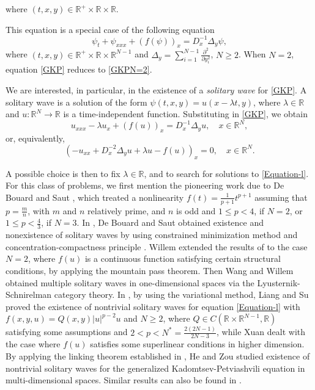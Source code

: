 \documentclass[11pt]{amsart}
\numberwithin{equation}{section}
\begin{document}
where $(t, x, y) \in \mathbb{R}^{+} \times \mathbb{R} \times \mathbb{R}$. {This equation is a special case of the following equation
\begin{equation}\label{GKP}
        \psi_t+\psi_{x x x}+(f(\psi))_x=D_x^{-1} \Delta_y \psi,
\end{equation}
where $(t, x, y) \in \mathbb{R}^{+} \times \mathbb{R} \times \mathbb{R}^{N-1}$ and $\Delta_y=\sum_{i=1}^{N-1} \frac{\partial^2}{\partial y_i^2}$, $N \geq 2$. When $N=2$, equation \eqref{GKP} reduces to \eqref{GKPN=2}.


We are interested, in particular, in the existence of a {\it solitary wave} for \eqref{GKP}.
A solitary wave is a solution of the form {$\psi(t, x, y) = u(x-\lambda t, y)$, where $\lambda \in \mathbb{R}$ and $u: \mathbb{R}^N \rightarrow \mathbb{R}$ is a time-independent function}.
 Substituting in \eqref{GKP}, we obtain
$$
u_{x x x}-\lambda u_x+(f(u))_x=D_x^{-1} \Delta_y u, \quad x\in \mathbb{R}^N,
$$
or, equivalently,
\begin{equation}\label{Equation-l}
\left(-u_{x x}+D_x^{-2} \Delta_y u+\lambda u-f(u)\right)_x=0, \quad x\in \mathbb{R}^N.
\end{equation}

A possible choice is then to fix $\lambda \in \mathbb{R}$, and to search for solutions to \eqref{Equation-l}.
For this class of problems, we first mention the pioneering work
due to  De Bouard and Saut \cite{DS0, DS}, which treated a nonlinearity {$f(t)=\frac{1}{p+1} t^{p+1}$} assuming that $p=\frac{m}{n}$, with $m$ and $n$ relatively prime, and $n$ is odd and $1 \leq p<4$, if $N=2$, or $1 \leq p<\frac{4}{3}$, if $N=3$. In \cite{DS0, DS}, De Bouard and Saut obtained existence and nonexistence of solitary waves by using constrained minimization method and concentration-compactness principle \cite{LionsCCPLocal2}. Willem \cite{Willem} extended the results of \cite{DS0} to the case \( N = 2 \), where \( f(u) \) is a continuous function satisfying certain structural conditions, by applying the mountain pass theorem.
Then Wang and Willem \cite{WW} obtained multiple solitary waves in one-dimensional spaces via the Lyusternik-Schnirelman category theory.  In \cite{LS}, by using the variational method, Liang and Su proved the existence of nontrivial solitary waves for equation \eqref{Equation-l} with
$f(x, y, u)=Q(x, y)\vert u\vert^{p-2}u$ and $N\geq 2$, where $Q\in C(\mathbb{R}\times\mathbb{R}^{N-1}, \mathbb{R})$ satisfying some assumptions and $2<p<N^{*}=\frac{2(2N-1)}{2N-3}$, while Xuan \cite{Xu} dealt with the case where $f(u)$ satisfies some superlinear conditions in higher dimension. By applying the linking theorem established in \cite{SZ}, He and Zou \cite{HZ} studied existence of nontrivial solitary waves for the generalized Kadomtsev-Petviashvili equation in multi-dimensional spaces. Similar results can also be found in \cite{Z}.


}
\end{document}
